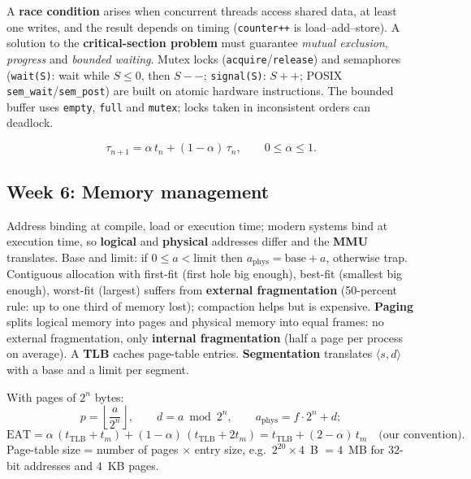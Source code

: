 \documentclass[11pt,a4paper]{article}
\newcommand{\term}[1]{\textbf{\color{mintdeep}#1}}
\newcommand{\cmd}[1]{\texttt{#1}}
\begin{document}
A \term{race condition} arises when concurrent threads access shared data, at least one writes, and the result depends on timing (\texttt{counter++} is load--add--store). A solution to the \term{critical-section problem} must guarantee \emph{mutual exclusion}, \emph{progress} and \emph{bounded waiting}. Mutex locks (\texttt{acquire}/\texttt{release}) and semaphores (\texttt{wait(S)}: wait while $S \le 0$, then $S{-}{-}$; \texttt{signal(S)}: $S{+}{+}$; POSIX \cmd{sem\_wait}/\cmd{sem\_post}) are built on atomic hardware instructions. The bounded buffer uses \texttt{empty}, \texttt{full} and \texttt{mutex}; locks taken in inconsistent orders can deadlock.
\begin{example}
\[
\tau_{n+1} = \alpha\, t_n + (1-\alpha)\,\tau_n, \qquad 0 \le \alpha \le 1.
\]
\end{example}

\subsection{Week 6: Memory management}
Address binding at compile, load or execution time; modern systems bind at execution time, so \term{logical} and \term{physical} addresses differ and the \term{MMU} translates. Base and limit: if $0 \le a < \text{limit}$ then $a_{\text{phys}} = \text{base} + a$, otherwise trap. Contiguous allocation with first-fit (first hole big enough), best-fit (smallest big enough), worst-fit (largest) suffers from \term{external fragmentation} (50-percent rule: up to one third of memory lost); compaction helps but is expensive. \term{Paging} splits logical memory into pages and physical memory into equal frames: no external fragmentation, only \term{internal fragmentation} (half a page per process on average). A \term{TLB} caches page-table entries. \term{Segmentation} translates $\langle s, d\rangle$ with a base and a limit per segment.
\begin{example}
With pages of $2^{n}$ bytes:
\[
p = \left\lfloor \frac{a}{2^{n}} \right\rfloor,\qquad d = a \bmod 2^{n},\qquad a_{\text{phys}} = f \cdot 2^{n} + d;
\]
\[
\text{EAT} = \alpha\,(t_{\text{TLB}} + t_m) + (1-\alpha)\,(t_{\text{TLB}} + 2t_m) = t_{\text{TLB}} + (2-\alpha)\,t_m \quad\text{(our convention)}.
\]
Page-table size = number of pages $\times$ entry size, e.g.\ $2^{20} \times 4$~B $= 4$~MB for $32$-bit addresses and $4$~KB pages.
\end{example}
\end{document}
